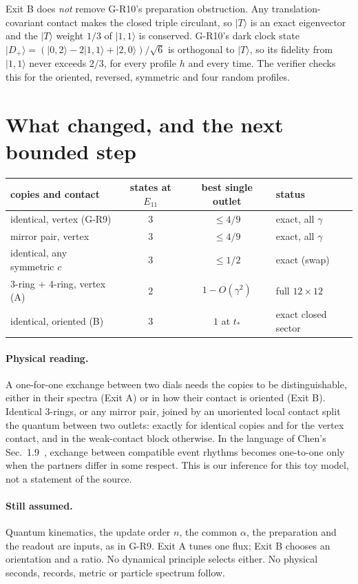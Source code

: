 \documentclass[11pt,a4paper]{article}
\newcommand{\ket}[1]{|#1\rangle}
\begin{document}
Exit B does \emph{not} remove G-R10's preparation obstruction. Any
translation-covariant contact makes the closed triple circulant, so
$\ket T$ is an exact eigenvector and the $\ket T$ weight $1/3$ of
$\ket{1,1}$ is conserved. G-R10's dark clock state
$\ket{D_+}=(\ket{0,2}-2\ket{1,1}+\ket{2,0})/\sqrt6$ is orthogonal to
$\ket T$, so its fidelity from $\ket{1,1}$ never exceeds $2/3$, for every
profile $h$ and every time. The verifier checks this for the oriented,
reversed, symmetric and four random profiles.

\section{What changed, and the next bounded step}
\begin{center}
\begin{tabular}{lccl}\toprule
copies and contact & states at $E_{11}$ & best single outlet & status\\\midrule
identical, vertex (G-R9) & 3 & $\le4/9$ & exact, all $\gamma$\\
mirror pair, vertex & 3 & $\le4/9$ & exact, all $\gamma$\\
identical, any symmetric $c$ & 3 & $\le1/2$ & exact (swap)\\
3-ring + 4-ring, vertex (A) & 2 & $1-O(\gamma^2)$ & full $12\times12$\\
identical, oriented (B) & 3 & $1$ at $t_*$ & exact closed sector\\\bottomrule
\end{tabular}
\end{center}

\paragraph{Physical reading.}
A one-for-one exchange between two dials needs the copies to be
distinguishable, either in their spectra (Exit A) or in how their contact
is oriented (Exit B). Identical 3-rings, or any mirror pair, joined by an
unoriented local contact split the quantum between two outlets: exactly
for identical copies and for the vertex contact, and in the weak-contact
block otherwise. In the
language of Chen's Sec.~1.9~\cite{chen}, exchange between compatible event
rhythms becomes one-to-one only when the partners differ in some
respect. This is our inference for this toy model, not a statement of the
source.

\paragraph{Still assumed.}
Quantum kinematics, the update order $n$, the common $\alpha$, the
preparation and the readout are inputs, as in G-R9. Exit A tunes one flux;
Exit B chooses an orientation and a ratio. No dynamical principle selects
either. No physical seconds, records, metric or particle spectrum follow.
\end{document}
